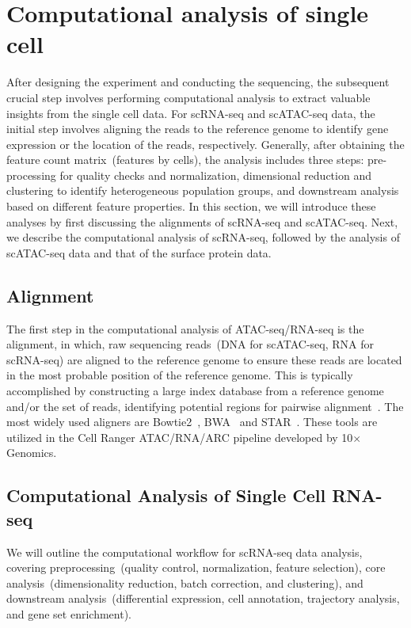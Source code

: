 \section{Computational analysis of single cell}
\label{background:computational_singlecell}
After designing the experiment and conducting the sequencing, the subsequent crucial step involves performing computational analysis to extract valuable insights from the single cell data. For scRNA-seq and scATAC-seq data, the initial step involves aligning the reads to the reference genome to identify gene expression or the location of the reads, respectively. Generally, after obtaining the feature count matrix~(features by cells), the analysis includes three steps: pre-processing for quality checks and normalization, dimensional reduction and clustering to identify heterogeneous population groups, and downstream analysis based on different feature properties. In this section, we will introduce these analyses by first discussing the alignments of scRNA-seq and scATAC-seq. Next, we describe the computational analysis of scRNA-seq, followed by the analysis of scATAC-seq data and that of the surface protein data.

\subsection{Alignment}
\label{background:sec2:alignment}
The first step in the computational analysis of ATAC-seq/RNA-seq is the alignment, in which, raw sequencing reads~(DNA for scATAC-seq, RNA for scRNA-seq) are aligned to the reference genome to ensure these reads are located in the most probable position of the reference genome. This is typically accomplished by constructing a large index database from a reference genome and/or the set of reads, identifying potential regions for pairwise alignment~\citep{alser2021alignment}. The most widely used aligners are Bowtie2~\citep{langmead2012bowtie2}, BWA~\citep{li2009BWA} and STAR~\citep{dobin2013star}. These tools are utilized in the Cell Ranger ATAC/RNA/ARC pipeline developed by 10$\times$ Genomics.

\subsection{Computational Analysis of Single Cell RNA-seq}
\label{background:sec2:scRNA}
We will outline the computational workflow for scRNA-seq data analysis, covering preprocessing~(quality control, normalization, feature selection), core analysis~(dimensionality reduction, batch correction, and clustering), and downstream analysis~(differential expression, cell annotation, trajectory analysis, and gene set enrichment).

